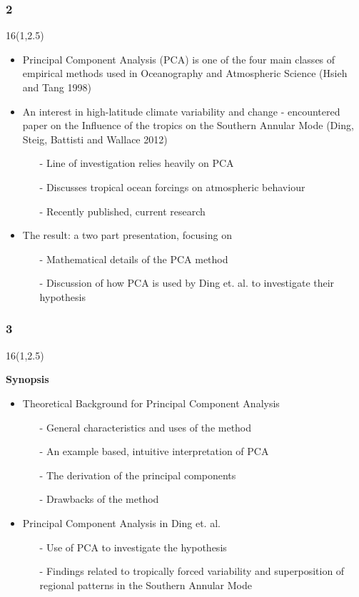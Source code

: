 \documentclass{beamer}
\newcommand\FrameText[1]{
\begin{textblock}{16}(1,2.5)
\raggedright #1
\end{textblock}}
\begin{document}
\begin{frame}
\frametitle{2}
\FrameText{\bf{\large}}
\begin{itemize}
\item Principal Component Analysis (PCA) is one of the four main classes of empirical methods used in Oceanography and Atmospheric Science (Hsieh and Tang 1998)~\cite{hsi}
\item An interest in high-latitude climate variability and change - encountered paper on the Influence of the tropics on the Southern Annular Mode (Ding, Steig, Battisti and Wallace 2012)~\cite{din}
\begin{itemize}
\scriptsize
\item[-] Line of investigation relies heavily on PCA
\item[-] Discusses tropical ocean forcings on atmospheric behaviour
\item[-] Recently published, current research
\end{itemize}
\item The result: a two part presentation, focusing on
\begin{itemize}
\scriptsize
\item[-] Mathematical details of the PCA method
\item[-] Discussion of how PCA is used by Ding et. al. to investigate their hypothesis
\end{itemize}
\end{itemize}
\end{frame}

\begin{frame}
\frametitle{3}
\FrameText{\bf{\large Synopsis}}
\begin{itemize}
\item Theoretical Background for Principal Component Analysis
\begin{itemize}
\scriptsize
\normalfont
\item[-] General characteristics and uses of the method
\item[-] An example based, intuitive interpretation of PCA
\item[-] The derivation of the principal components
\item[-] Drawbacks of the method
\end{itemize}
\footnotesize
\item Principal Component Analysis in Ding et. al.
\begin{itemize}
\normalfont
\scriptsize
\item[-] Use of PCA to investigate the hypothesis
\item[-] Findings related to tropically forced variability and superposition of regional patterns in the Southern Annular Mode
\end{itemize}
\end{itemize}
\end{frame}
\end{document}
